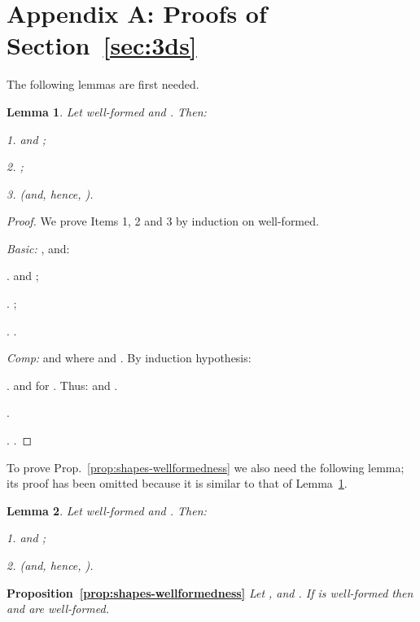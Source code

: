 \documentclass[11pt]{article}
\newtheorem{lemma}{Lemma}
\begin{document}
\section*{Appendix A: Proofs of Section~\ref{sec:3ds}}
The following lemmas are first needed.
\begin{lemma}\label{lemma:shape-properties1}
Let  well-formed and . Then:

1.  and ;

2. ;

3.  (and, hence, ).
\end{lemma}
\begin{proof}
We prove Items 1, 2 and 3 by induction on  well-formed.

\smallskip \noindent 
{\em Basic:} ,  and:
 
.  and ;

. ;

. .

\par\medskip\noindent
{\em Comp:}  and  where  and . By induction hypothesis:

\par\medskip{}.  and 
for .
Thus:  and .

\par\medskip{}.  

\vspace*{0.2cm}

. .

\end{proof}

\par\medskip\noindent
To prove Prop.~\ref{prop:shapes-wellformedness} we also need the following lemma; its proof has been
omitted because it is similar to that of Lemma~\ref{lemma:shape-properties1}.
\begin{lemma}\label{lemma:shape-properties2}
Let  well-formed and . Then:

1.  and ;

2.  (and, hence,
).
\end{lemma}
\par\medskip\noindent
{\bf Proposition~\ref{prop:shapes-wellformedness}}
{\em Let ,  and . If  is well-formed then 
and  are well-formed.}
\end{document}
